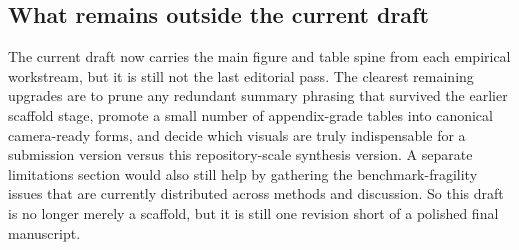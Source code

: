 \subsection{What remains outside the current draft}

The current draft now carries the main figure and table spine from each empirical workstream, but it is still not the last editorial pass. The clearest remaining upgrades are to prune any redundant summary phrasing that survived the earlier scaffold stage, promote a small number of appendix-grade tables into canonical camera-ready forms, and decide which visuals are truly indispensable for a submission version versus this repository-scale synthesis version. A separate limitations section would also still help by gathering the benchmark-fragility issues that are currently distributed across methods and discussion. So this draft is no longer merely a scaffold, but it is still one revision short of a polished final manuscript.
